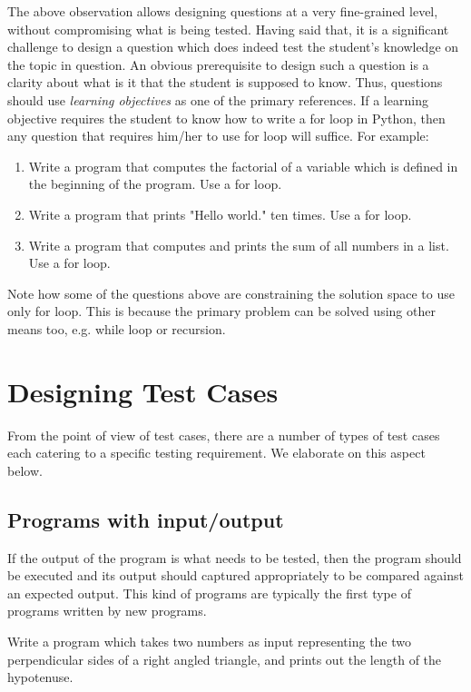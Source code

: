 \documentclass[12pt]{article}
\begin{document}
The above observation allows designing questions at a very fine-grained level, without compromising what is being tested. Having said that, it is a significant challenge to design a question which does indeed test the student's knowledge on the topic in question. An obvious prerequisite to design such a question is a clarity about what is it that the student is supposed to know. Thus, questions should use \textit{learning objectives} as one of the primary references. If a learning objective requires the student to know how to write a for loop in Python, then any question that requires him/her to use for loop will suffice. For example:
\begin{enumerate}
\item Write a program that computes the factorial of a variable \lstinline@x@ which is defined in the beginning of the program. Use a for loop.
\item Write a program that prints "Hello world." ten times. Use a for loop.
\item Write a program that computes and prints the sum of all numbers in a list. Use a for loop.
\end{enumerate}

Note how some of the questions above are constraining the solution space to use only for loop. This is because the primary problem can be solved using other means too, e.g. while loop or recursion.

\section{Designing Test Cases}
From the point of view of test cases, there are a number of types of test cases each catering to a specific testing requirement. We elaborate on this aspect below.

\subsection{Programs with input/output} \label{s:pio}
If the output of the program is what needs to be tested, then the program should be executed and its output should captured appropriately to be compared against an expected output. This kind of programs are typically the first type of programs written by new programs.

\begin{mdframed}[frametitle=Example]
Write a program which takes two numbers as input representing the two
perpendicular sides of a right angled triangle, and prints out the length of the
hypotenuse.
\end{mdframed}
\end{document}
